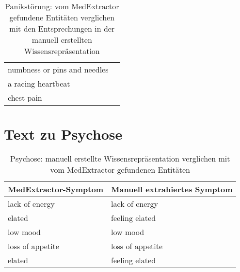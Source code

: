 \begin{table}[H]
\begin{center}
\begin{tabular}{ll}
                  numbness or pins and needles &                     \\
                            a racing heartbeat &                     \\
                                    chest pain &                     \\
\bottomrule
\end{tabular}
\caption{Panikstörung: vom MedExtractor gefundene Entitäten verglichen mit den Entsprechungen in der manuell erstellten Wissensrepräsentation}
\label{tab:panicdisorder_medextractor_manuell}
\end{center}
\end{table}

\section{Text zu Psychose}
\label{sec:psychosis} 

\begin{table}[H]
\begin{center}
\begin{tabular}{ll}
\toprule
  MedExtractor-Symptom &                       Manuell extrahiertes Symptom \\
\midrule
       lack of energy &   lack of energy \\
              elated &   feeling elated \\
            low mood &         low mood \\
    loss of appetite & loss of appetite \\
              elated &   feeling elated \\
\bottomrule
\end{tabular}
\caption{Psychose: manuell erstellte Wissensrepräsentation verglichen mit vom MedExtractor gefundenen Entitäten}
\label{tab:psychosis_vergleich_manuell_medextractor}
\end{center}
\end{table}


